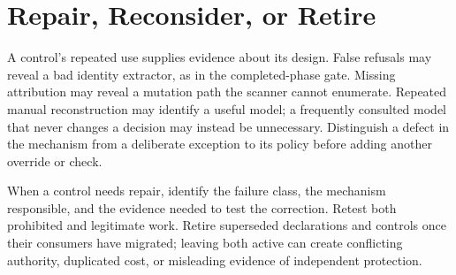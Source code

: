 \section{Repair, Reconsider, or Retire}

A control's repeated use supplies evidence about its design. False refusals may reveal a bad identity extractor, as in the completed-phase gate. Missing attribution may reveal a mutation path the scanner cannot enumerate. Repeated manual reconstruction may identify a useful model; a frequently consulted model that never changes a decision may instead be unnecessary. Distinguish a defect in the mechanism from a deliberate exception to its policy before adding another override or check.

When a control needs repair, identify the failure class, the mechanism responsible, and the evidence needed to test the correction. Retest both prohibited and legitimate work. Retire superseded declarations and controls once their consumers have migrated; leaving both active can create conflicting authority, duplicated cost, or misleading evidence of independent protection.
